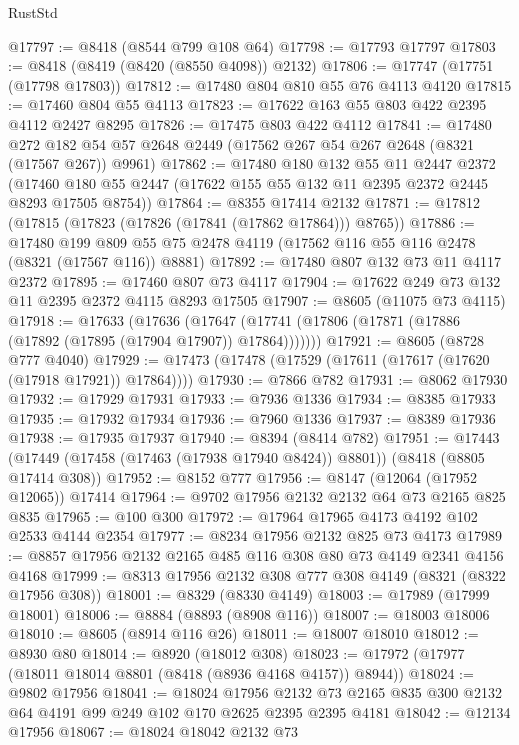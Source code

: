 \begin{lexlean}{RustStd}
\begin{coremodule}
@17797 := @8418 (@8544 @799 @108 @64)
@17798 := @17793 @17797
@17803 := @8418 (@8419 (@8420 (@8550 @4098)) @2132)
@17806 := @17747 (@17751 (@17798 @17803))
@17812 := @17480 @804 @810 @55 @76 @4113 @4120
@17815 := @17460 @804 @55 @4113
@17823 := @17622 @163 @55 @803 @422 @2395 @4112 @2427 @8295
@17826 := @17475 @803 @422 @4112
@17841 := @17480
    @272
    @182
    @54
    @57
    @2648
    @2449
    (@17562 @267 @54 @267 @2648 (@8321 (@17567 @267)) @9961)
@17862 := @17480
    @180
    @132
    @55
    @11
    @2447
    @2372
    (@17460 @180 @55 @2447 (@17622 @155 @55 @132 @11 @2395 @2372 @2445 @8293 @17505 @8754))
@17864 := @8355 @17414 @2132
@17871 := @17812 (@17815 (@17823 (@17826 (@17841 (@17862 @17864))) @8765))
@17886 := @17480
    @199
    @809
    @55
    @75
    @2478
    @4119
    (@17562 @116 @55 @116 @2478 (@8321 (@17567 @116)) @8881)
@17892 := @17480 @807 @132 @73 @11 @4117 @2372
@17895 := @17460 @807 @73 @4117
@17904 := @17622 @249 @73 @132 @11 @2395 @2372 @4115 @8293 @17505
@17907 := @8605 (@11075 @73 @4115)
@17918 := @17633
    (@17636 (@17647 (@17741 (@17806 (@17871 (@17886 (@17892 (@17895 (@17904 @17907)) @17864)))))))
@17921 := @8605 (@8728 @777 @4040)
@17929 := @17473 (@17478 (@17529 (@17611 (@17617 (@17620 (@17918 @17921)) @17864))))
@17930 := @7866 @782
@17931 := @8062 @17930
@17932 := @17929 @17931
@17933 := @7936 @1336
@17934 := @8385 @17933
@17935 := @17932 @17934
@17936 := @7960 @1336
@17937 := @8389 @17936
@17938 := @17935 @17937
@17940 := @8394 (@8414 @782)
@17951 := @17443 (@17449 (@17458 (@17463 (@17938 @17940 @8424)) @8801)) (@8418 (@8805 @17414 @308))
@17952 := @8152 @777
@17956 := @8147 (@12064 (@17952 @12065)) @17414
@17964 := @9702 @17956 @2132 @2132 @64 @73 @2165 @825 @835
@17965 := @100 @300
@17972 := @17964 @17965 @4173 @4192 @102 @2533 @4144 @2354
@17977 := @8234 @17956 @2132 @825 @73 @4173
@17989 := @8857 @17956 @2132 @2165 @485 @116 @308 @80 @73 @4149 @2341 @4156 @4168
@17999 := @8313 @17956 @2132 @308 @777 @308 @4149 (@8321 (@8322 @17956 @308))
@18001 := @8329 (@8330 @4149)
@18003 := @17989 (@17999 @18001)
@18006 := @8884 (@8893 (@8908 @116))
@18007 := @18003 @18006
@18010 := @8605 (@8914 @116 @26)
@18011 := @18007 @18010
@18012 := @8930 @80
@18014 := @8920 (@18012 @308)
@18023 := @17972 (@17977 (@18011 @18014 @8801 (@8418 (@8936 @4168 @4157)) @8944))
@18024 := @9802 @17956
@18041 := @18024
    @17956
    @2132
    @73
    @2165
    @835
    @300
    @2132
    @64
    @4191
    @99
    @249
    @102
    @170
    @2625
    @2395
    @2395
    @4181
@18042 := @12134 @17956
@18067 := @18024
    @18042
    @2132
    @73

\end{coremodule}
\end{lexlean}
